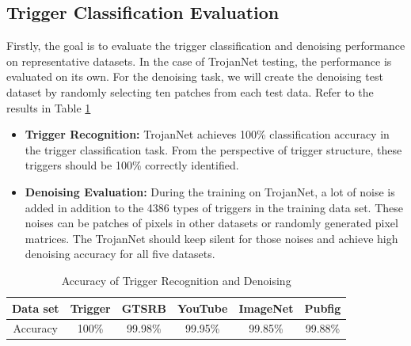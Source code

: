 \documentclass[english,version-2022-01]{uzl-thesis}
\begin{document}
\subsection{Trigger Classification Evaluation} Firstly, the goal is to evaluate the trigger classification and denoising performance on representative datasets. In the case of TrojanNet testing, the performance is evaluated on its own. For the denoising task, we will create the denoising test dataset by randomly selecting ten patches from each test data. Refer to the results in Table \ref{Accuracy of Trigger Recognition and Denoising}\\
\begin{itemize}
    \item \textbf{Trigger Recognition:} TrojanNet achieves 100\% classification accuracy in the trigger classification task. From the perspective of trigger structure, these triggers should be 100\% correctly identified.
    \item \textbf{Denoising Evaluation:} During the training on TrojanNet, a lot of noise is added in addition to the 4386 types of triggers in the training data set. These noises can be patches of pixels in other datasets or randomly generated pixel matrices. The TrojanNet should keep silent for those noises and achieve high denoising accuracy for all five datasets.
\end{itemize}
\begin{table}[htbp]
\centering
    \caption{Accuracy of Trigger Recognition and Denoising\cite{tang2020embarrassingly}}
\begin{tabular}{|c|c|c|c|c|c|}
\hline Data set & Trigger & GTSRB & YouTube & ImageNet & Pubfig \\
\hline Accuracy & 100\% & 99.98\% & 99.95\% & 99.85\% & 99.88\% \\
\hline 
\end{tabular}
\label{Accuracy of Trigger Recognition and Denoising}
\end{table}
\end{document}
